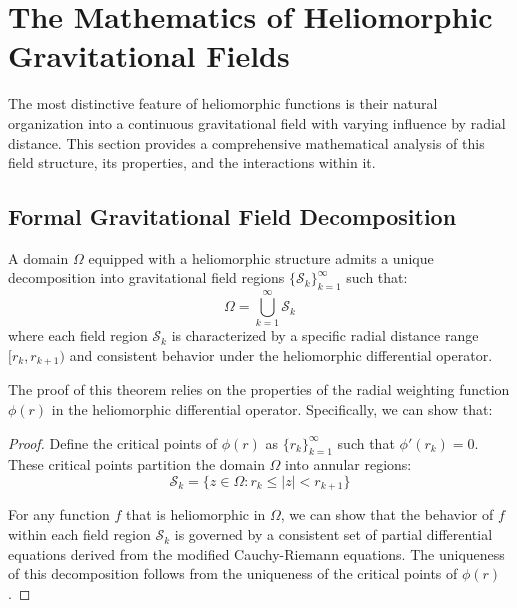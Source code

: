 \section{The Mathematics of Heliomorphic Gravitational Fields}

The most distinctive feature of heliomorphic functions is their natural organization into a continuous gravitational field with varying influence by radial distance. This section provides a comprehensive mathematical analysis of this field structure, its properties, and the interactions within it.

\subsection{Formal Gravitational Field Decomposition}

\begin{theorem}
A domain $\Omega$ equipped with a heliomorphic structure admits a unique decomposition into gravitational field regions $\{\mathcal{S}_k\}_{k=1}^{\infty}$ such that:
\begin{equation}
\Omega = \bigcup_{k=1}^{\infty} \mathcal{S}_k
\end{equation}
where each field region $\mathcal{S}_k$ is characterized by a specific radial distance range $[r_k, r_{k+1})$ and consistent behavior under the heliomorphic differential operator.
\end{theorem}

The proof of this theorem relies on the properties of the radial weighting function $\phi(r)$ in the heliomorphic differential operator. Specifically, we can show that:

\begin{proof}
Define the critical points of $\phi(r)$ as $\{r_k\}_{k=1}^{\infty}$ such that $\phi'(r_k) = 0$. These critical points partition the domain $\Omega$ into annular regions:
\begin{equation}
\mathcal{S}_k = \{z \in \Omega : r_k \leq |z| < r_{k+1}\}
\end{equation}

For any function $f$ that is heliomorphic in $\Omega$, we can show that the behavior of $f$ within each field region $\mathcal{S}_k$ is governed by a consistent set of partial differential equations derived from the modified Cauchy-Riemann equations. The uniqueness of this decomposition follows from the uniqueness of the critical points of $\phi(r)$.
\end{proof}

